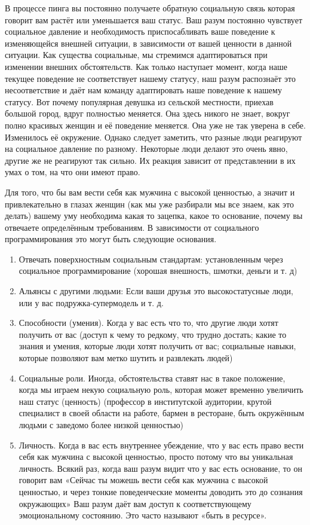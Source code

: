 \RULE  В процессе пинга вы постоянно получаете обратную социальную связь которая говорит вам растёт или уменьшается ваш статус. Ваш разум постоянно чувствует социальное давление и необходимость приспосабливать ваше поведение к изменяющейся внешней ситуации, в зависимости от вашей ценности в данной ситуации. Как существа социальные, мы стремимся адаптироваться при изменении внешних обстоятельств. Как только наступает момент, когда наше текущее поведение не соответствует нашему статусу, наш разум распознаёт это несоответствие и даёт нам команду адаптировать наше поведение к нашему статусу. Вот почему популярная девушка из сельской местности, приехав большой город, вдруг полностью меняется. Она здесь никого не знает, вокруг полно красивых женщин и её поведение меняется. Она уже не так уверена в себе. Изменилось её окружение. Однако следует заметить, что разные люди реагируют на социальное давление по разному. Некоторые люди делают это очень явно, другие же не реагируют так сильно. Их реакция зависит от представлении в их умах о том, на что они имеют право.

Для того, что бы вам вести себя как мужчина с высокой ценностью, а значит и привлекательно в глазах женщин (как мы уже разбирали мы все знаем, как это делать) вашему уму необходима какая то зацепка, какое то основание, почему вы отвечаете определённым требованиям. В зависимости от социального программирования это могут быть следующие основания.

\begin{enumerate}
\item Отвечать поверхностным социальным стандартам: установленным через социальное программирование (хорошая внешность, шмотки, деньги и т. д)
\item Альянсы с другими людьми: Если ваши друзья это высокостатусные люди, или у вас подружка-супермодель и т. д.
\item Способности (умения). Когда у вас есть что то, что другие люди хотят получить от вас (доступ к чему то редкому, что трудно достать; какие то знания и умения, которые люди хотят получить от вас; социальные навыки, которые позволяют вам метко шутить и развлекать людей)
\item Социальные роли. Иногда, обстоятельства ставят нас в такое положение, когда мы играем некую социальную роль, которая может временно увеличить наш статус (ценность) (профессор в институтской аудитории, крутой специалист в своей области на работе, бармен в ресторане, быть окружённым людьми с заведомо более низкой ценностью)
\item Личность. Когда в вас есть внутреннее убеждение, что у вас есть право вести себя как мужчина с высокой ценностью, просто потому что вы уникальная личность. Всякий раз, когда ваш разум видит что у вас есть основание, то он говорит вам «Сейчас ты можешь вести себя как мужчина с высокой ценностью, и через тонкие поведенческие моменты доводить это до сознания окружающих» Ваш разум даёт вам доступ к соответствующему эмоциональному состоянию. Это часто называют «быть в ресурсе».
\end{enumerate}

